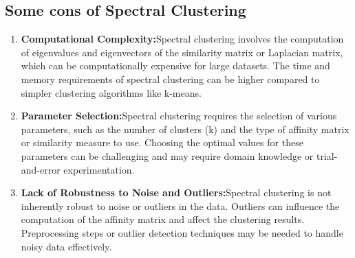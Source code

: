 \documentclass{article}
\begin{document}
    \subsection{Some cons of Spectral Clustering}
        \begin{enumerate}
            \item \textbf{Computational Complexity:}Spectral clustering involves the computation of eigenvalues and eigenvectors of the similarity matrix or Laplacian matrix, which can be computationally expensive for large datasets. The time and memory requirements of spectral clustering can be higher compared to simpler clustering algorithms like k-means.
            \item \textbf{Parameter Selection:}Spectral clustering requires the selection of various parameters, such as the number of clusters (k) and the type of affinity matrix or similarity measure to use. Choosing the optimal values for these parameters can be challenging and may require domain knowledge or trial-and-error experimentation.
            \item \textbf{Lack of Robustness to Noise and Outliers:}Spectral clustering is not inherently robust to noise or outliers in the data. Outliers can influence the computation of the affinity matrix and affect the clustering results. Preprocessing steps or outlier detection techniques may be needed to handle noisy data effectively.
        \end{enumerate}

\section{}
\end{document}
